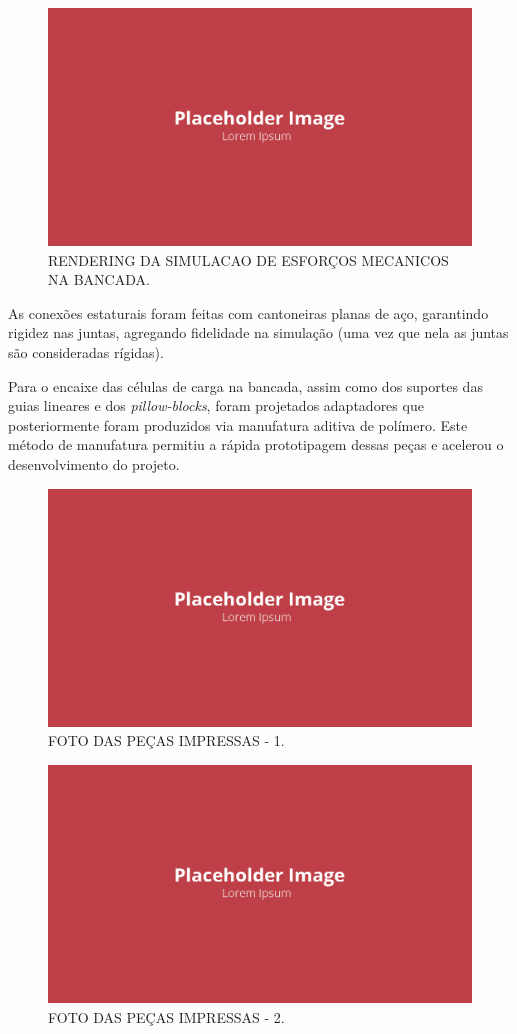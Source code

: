 \begin{figure}[!ht]
    \centering
    \includegraphics[width=.8\linewidth]{figuras/placeholder.png}
    \caption{RENDERING DA SIMULACAO DE ESFORÇOS MECANICOS NA BANCADA\cite{autor}.}
    \label{fig:placeholder}
\end{figure}

As conexões estaturais foram feitas com cantoneiras planas de aço, garantindo rigidez nas juntas, agregando fidelidade na simulação (uma vez que nela as juntas são consideradas rígidas).

Para o encaixe das células de carga na bancada, assim como dos suportes das guias lineares e dos \textit{pillow-blocks}, foram projetados adaptadores que posteriormente foram produzidos via manufatura aditiva de polímero. Este método de manufatura permitiu a rápida prototipagem dessas peças e acelerou o desenvolvimento do projeto.

\begin{figure}[!ht]
    \centering
    \includegraphics[width=.8\linewidth]{figuras/placeholder.png}
    \caption{FOTO DAS PEÇAS IMPRESSAS - 1\cite{autor}.}
    \label{fig:placeholder}
\end{figure}

\begin{figure}[!ht]
    \centering
    \includegraphics[width=.8\linewidth]{figuras/placeholder.png}
    \caption{FOTO DAS PEÇAS IMPRESSAS - 2\cite{autor}.}
    \label{fig:placeholder}
\end{figure}

